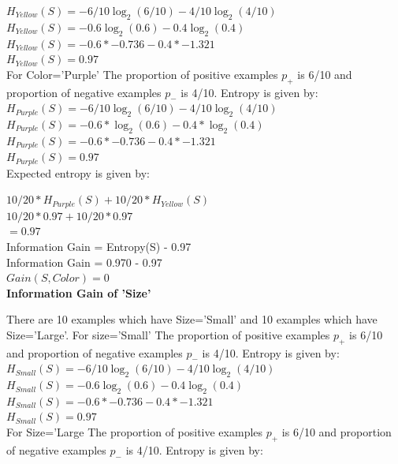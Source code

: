 \documentclass[11pt]{article}
\begin{document}
\begin{enumerate}
\begin{enumerate}
			$H_{Yellow}(S)=-6/10 \log_2{(6/10)} -4/10\log_2{(4/10)}$\\
			$H_{Yellow}(S)=-0.6 \log_2{(0.6)} -0.4\log_2{(0.4)}$\\
			$H_{Yellow}(S)=-0.6 * -0.736  -0.4* -1.321$\\
			$H_{Yellow}(S)=0.97$\\
			
			For Color='Purple' The proportion of positive examples $p_+$  is 6/10 and proportion of negative examples $p_-$ is 4/10. Entropy is given by:\\
			
			$H_{Purple}(S)=-6/10 \log_2{(6/10)} -4/10\log_2{(4/10)}$\\
			$H_{Purple}(S)=-0.6 * \log_2{(0.6)}  -0.4 *\log_2{(0.4)}$\\
			$H_{Purple}(S)=-0.6 * -0.736  -0.4* -1.321$\\
			$H_{Purple}(S)=0.97$\\
			
			Expected entropy is given by:
			
			$10/20 * H_{Purple}(S) + 10/20 * H_{Yellow}(S)$ \\
			$10/20 * 0.97+ 10/20 * 0.97$ \\
			$=0.97$\\
			
			Information Gain = Entropy(S) - 0.97\\
			Information Gain = 0.970 - 0.97\\
			$\boxed{Gain(S,Color)=0}$ \\
			
			
			\textbf{ Information Gain of 'Size'}
			
			There are 10 examples which have Size='Small' and 10 examples which have Size='Large'. For size='Small' The proportion of positive examples $p_+$  is 6/10 and proportion of negative examples $p_-$ is 4/10. Entropy is given by:\\
			
			$H_{Small}(S)=-6/10 \log_2{(6/10)} -4/10\log_2{(4/10)}$\\
			$H_{Small}(S)=-0.6 \log_2{(0.6)} -0.4\log_2{(0.4)}$\\
			$H_{Small}(S)=-0.6 * -0.736  -0.4* -1.321$\\
			$H_{Small}(S)=0.97$\\
			
			For Size='Large The proportion of positive examples $p_+$  is 6/10 and proportion of negative examples $p_-$ is 4/10. Entropy is given by:\\
			

\end{enumerate}
\end{enumerate}
\end{document}
